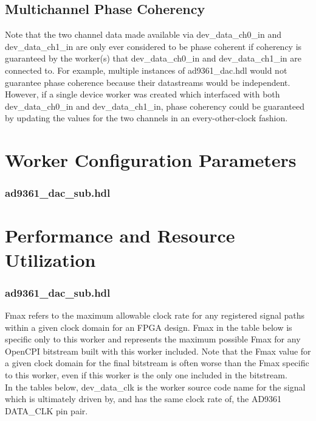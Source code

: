\documentclass{article}
\def\comp{ad9361\_dac\_sub}
\edef\ecomp{ad9361_dac_sub}
\begin{document}
\subsection*{Multichannel Phase Coherency}
Note that the two channel data made available via dev\_data\_ch0\_in and dev\_data\_ch1\_in are only ever considered to be phase coherent if coherency is guaranteed by the worker(s) that dev\_data\_ch0\_in and dev\_data\_ch1\_in are connected to. For example, multiple instances of ad9361\_dac.hdl would not guarantee phase coherence because their datastreams would be independent. However, if a single device worker was created which interfaced with both dev\_data\_ch0\_in and dev\_data\_ch1\_in, phase coherency could be guaranteed by updating the values for the two channels in an every-other-clock fashion.

\section*{Worker Configuration Parameters}
\subsubsection*{\comp.hdl}

\section*{Performance and Resource Utilization}
\subsubsection*{\comp.hdl}
Fmax refers to the maximum allowable clock rate for any registered signal paths within a given clock domain for an FPGA design. Fmax in the table below is specific only to this worker and represents the maximum possible Fmax for any OpenCPI bitstream built with this worker included. Note that the Fmax value for a given clock domain for the final bitstream is often worse than the Fmax specific to this worker, even if this worker is the only one included in the bitstream. \\

\noindent In the tables below, dev\_data\_clk is the worker source code name for the signal which is ultimately driven by, and has the same clock rate of, the AD9361 DATA\_CLK pin pair. \\

%

\end{document}
